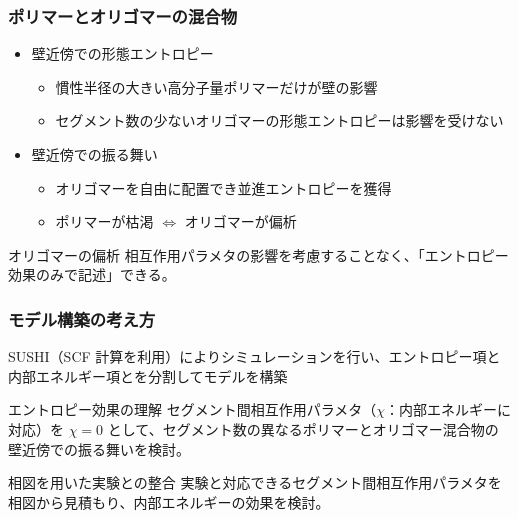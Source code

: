 \documentclass[12pt, dvipdfmx]{beamer}
\begin{document}
%
\begin{frame}
	\frametitle{ポリマーとオリゴマーの混合物}
	\large
	\begin{itemize}
		\item 壁近傍での形態エントロピー
		\begin{itemize}
			\item 慣性半径の大きい高分子量ポリマー\color{red}だけ\color{black}が壁の影響
			\item セグメント数の少ないオリゴマーの形態エントロピーは影響を受けない
		\end{itemize}
		\item 壁近傍での振る舞い
		\begin{itemize}
			\item \color{red}オリゴマーを自由に配置\color{black}でき並進エントロピーを獲得
			\item \color{red}ポリマーが枯渇 $\Leftrightarrow$ オリゴマーが偏析\color{black}
		\end{itemize}
	\end{itemize}
	\begin{block}{オリゴマーの偏析}
	相互作用パラメタの影響を考慮することなく、\color{red}「エントロピー効果のみで記述」\color{black}できる。
	\end{block}
\end{frame}

\begin{frame}\frametitle{モデル構築の考え方}
	SUSHI（SCF 計算を利用）によりシミュレーションを行い、エントロピー項と内部エネルギー項とを分割してモデルを構築
	\begin{block}{エントロピー効果の理解}
	セグメント間相互作用パラメタ（$\chi$：内部エネルギーに対応）を $\chi = 0$ として、セグメント数の異なるポリマーとオリゴマー混合物の壁近傍での振る舞いを検討。
	\end{block}
	
	\begin{exampleblock}{相図を用いた実験との整合}
	実験と対応できるセグメント間相互作用パラメタを相図から見積もり、内部エネルギーの効果を検討。
	\end{exampleblock}
\end{frame}
\end{document}
